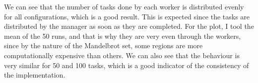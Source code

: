 \documentclass[unicode,11pt,a4paper,oneside,numbers=endperiod,openany]{scrartcl}
\begin{document}
We can see that the number of tasks done by each worker is distributed evenly
for all configurations, which is a good result. This is expected since the
tasks are distributed by the manager as soon as they are completed. For the
plot, I tool the mean of the 50 runs, and that is why they are very even through
the workers, since by the nature of the Mandelbrot set, some regions are more
computationally expensive than others. We can also see that the behaviour is
very similar for 50 and 100 tasks, which is a good indicator of the consistency
of the implementation.
\end{document}

